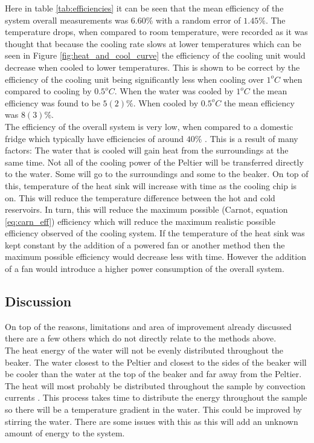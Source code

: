 \documentclass[10pt]{article}
\begin{document}
Here in table \ref{tab:efficiencies} it can be seen that the mean efficiency of the system overall measurements was $6.60\%$ with a random error of $1.45\%$. The temperature drops, when compared to room temperature, were recorded as it was thought that because the cooling rate slows at lower temperatures which can be seen in Figure \ref{fig:heat_and_cool_curve} the efficiency of the cooling unit would decrease when cooled to lower temperatures. This is shown to be correct by the efficiency of the cooling unit being significantly less when cooling over $1^oC$ when compared to cooling by $0.5^oC$. When the water was cooled by $1^oC$ the mean efficiency was found to be $5(2)\%$. When cooled by $0.5^oC$ the mean efficiency was $8(3)\%$.\\

The efficiency of the overall system is very low, when compared to a domestic fridge which typically have efficiencies of around $40\%$ \cite{fridge_lit}. This is a result of many factors: The water that is cooled will gain heat from the surroundings at the same time. Not all of the cooling power of the Peltier will be transferred directly to the water. Some will go to the surroundings and some to the beaker. On top of this, temperature of the heat sink will increase with time as the cooling chip is on. This will reduce the temperature difference between the hot and cold reservoirs. In turn, this will reduce the maximum possible (Carnot, equation \ref{eq:carn_eff}) efficiency which will reduce the maximum realistic possible efficiency observed of the cooling system. If the temperature of the heat sink was kept constant by the addition of a powered fan or another method then the maximum possible efficiency would decrease less with time. However the addition of a fan would introduce a higher power consumption of the overall system. 

\newpage
\subsection*{Discussion}
On top of the reasons, limitations and area of improvement already discussed there are a few others which do not directly relate to the methods above.\\

The heat energy of the water will not be evenly distributed throughout the beaker. The water closest to the Peltier and closest to the sides of the beaker will be cooler than the water at the top of the beaker and far away from the Peltier. The heat will most probably be distributed throughout the sample by convection currents \cite{conv_cur}. This process takes time to distribute the energy throughout the sample so there will be a temperature gradient in the water. This could be improved by stirring the water. There are some issues with this as this will add an unknown amount of energy to the system.\\
\end{document}
